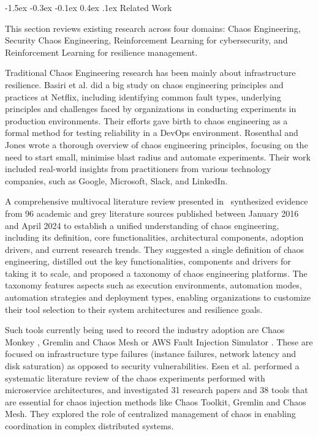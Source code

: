 \documentclass[conference,10pt]{IEEEtran}
\makeatletter
\renewcommand\section{\@startsection{section}{1}{\z@}%
	{-1.5ex \@plus -0.3ex \@minus -0.1ex}%
	{0.4ex \@plus.1ex}%
	{\normalfont\large\bfseries\centering}}
\makeatother
\begin{document}
\section{Related Work}

This section reviews existing research across four domains: Chaos Engineering, Security Chaos Engineering, Reinforcement Learning for cybersecurity, and Reinforcement Learning for resilience management.

Traditional Chaos Engineering research has been mainly about infrastructure resilience. Basiri et al. \cite{basiri2016chaos} did a big study on chaos engineering principles and practices at Netflix, including identifying common fault types, underlying principles and challenges faced by organizations in conducting experiments in production environments. Their efforts gave birth to chaos engineering as a formal method for testing reliability in a DevOps environment. Rosenthal and Jones \cite{rosenthal2020chaos} wrote a thorough overview of chaos engineering principles, focusing on the need to start small, minimise blast radius and automate experiments. Their work included real-world insights from practitioners from various technology companies, such as Google, Microsoft, Slack, and LinkedIn.

A comprehensive multivocal literature review presented in~\cite{owotogbe2025chaos} synthesized evidence from 96 academic and grey literature sources published between January 2016 and April 2024 to establish a unified understanding of chaos engineering, including its definition, core functionalities, architectural components, adoption drivers, and current research trends. They suggested a single definition of chaos engineering, distilled out the key functionalities, components and drivers for taking it to scale, and proposed a taxonomy of chaos engineering platforms. The taxonomy features aspects such as execution environments, automation modes, automation strategies and deployment types, enabling organizations to customize their tool selection to their system architectures and resilience goals. 

Such tools currently being used to record the industry adoption are Chaos Monkey \cite{basiri2016chaos}, Gremlin \cite{gremlin2022} and Chaos Mesh \cite{chaosmesh2021} or AWS Fault Injection Simulator \cite{awsfis2023}. These are focused on infrastructure type failures (instance failures, network latency and disk saturation) as opposed to security vulnerabilities. Esen et al. \cite{esen2025chaos} performed a systematic literature review of the chaos experiments performed with microservice architectures, and investigated 31 research papers and 38 tools that are essential for chaos injection methods like Chaos Toolkit, Gremlin and Chaos Mesh. They explored the role of centralized management of chaos in enabling coordination in complex distributed systems. 
\end{document}
